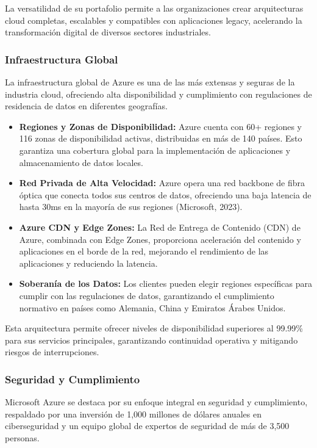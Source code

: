 {            La versatilidad de su portafolio permite a las organizaciones crear arquitecturas cloud completas, escalables y compatibles con aplicaciones legacy, acelerando la transformación digital de diversos sectores industriales.
            
            \subsubsection{Infraestructura Global}
                La infraestructura global de Azure es una de las más extensas y seguras de la industria cloud, ofreciendo alta disponibilidad y cumplimiento con regulaciones de residencia de datos en diferentes geografías.
                
                \begin{itemize}
                    \item \textbf{Regiones y Zonas de Disponibilidad:} Azure cuenta con 60+ regiones y 116 zonas de disponibilidad activas, distribuidas en más de 140 países. Esto garantiza una cobertura global para la implementación de aplicaciones y almacenamiento de datos locales.
                    \item \textbf{Red Privada de Alta Velocidad:} Azure opera una red backbone de fibra óptica que conecta todos sus centros de datos, ofreciendo una baja latencia de hasta 30ms en la mayoría de sus regiones (Microsoft, 2023).
                    \item \textbf{Azure CDN y Edge Zones:} La Red de Entrega de Contenido (CDN) de Azure, combinada con Edge Zones, proporciona aceleración del contenido y aplicaciones en el borde de la red, mejorando el rendimiento de las aplicaciones y reduciendo la latencia.
                    \item \textbf{Soberanía de los Datos:} Los clientes pueden elegir regiones específicas para cumplir con las regulaciones de datos, garantizando el cumplimiento normativo en países como Alemania, China y Emiratos Árabes Unidos.
                \end{itemize}
                
                Esta arquitectura permite ofrecer niveles de disponibilidad superiores al 99.99\% para sus servicios principales, garantizando continuidad operativa y mitigando riesgos de interrupciones.
                
            \subsubsection{Seguridad y Cumplimiento}
                Microsoft Azure se destaca por su enfoque integral en seguridad y cumplimiento, respaldado por una inversión de 1,000 millones de dólares anuales en ciberseguridad y un equipo global de expertos de seguridad de más de 3,500 personas.
                    
}
